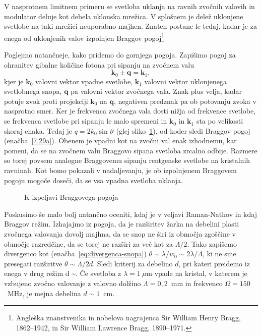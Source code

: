V nasprotnem limitnem primeru se svetloba uklanja na ravnih zvočnih valovih in modulator deluje 
kot debela uklonska mrežica. V splošnem je delež uklonjene svetlobe na taki mrežici neuporabno majhen. 
Znaten postane le tedaj, kadar je za enega od uklonjenih valov izpolnjen Braggov
pogoj\footnote{Angleška znanstvenika in nobelova nagrajenca Sir William Henry Bragg, 1862--1942,
in Sir William Lawrence Bragg, 1890--1971.}

Poglejmo natančneje, kako pridemo do gornjega pogoja. Zapišimo pogoj
za ohranitev gibalne količine fotona pri sipanju na zvočnem valu
\begin{equation}
\mathbf{k}_{0}\pm\mathbf{q}=\mathbf{k}_{1},
\label{7.30}
\end{equation}
kjer je $\mathbf{k}_{0}$ valovni vektor vpadne svetlobe, $\mathbf{k}_{1}$
valovni vektor uklonjenega svetlobnega snopa, $\mathbf{q}$ pa valovni
vektor zvočnega vala. Znak plus velja, kadar potuje zvok proti projekciji
$\mathbf{k}_{0}$ na $\mathbf{q}$, negativen predznak pa ob potovanju zvoka v nasprotno smer. 
Ker je frekvenca zvočnega vala dosti nižja od frekvence svetlobe, se frekvenca svetlobe 
pri sipanju le malo spremeni in $\mathbf{k}_{0}$ in $\mathbf{k}_{1}$ sta po velikosti skoraj enaka.
Tedaj je $q=2k_{0}\sin\vartheta$ (glej sliko~\ref{fig:ao_bragg3}), od koder sledi Braggov pogoj 
(enačba~\ref{7.29a}). Obenem je vpadni kot na zvočni val enak izhodnemu, kar pomeni, da se na
zvočnem valu Braggovo sipana svetloba zrcalno odbije. Razmere so torej
povsem analogne Braggovemu sipanju rentgenske svetlobe na kristalnih
ravninah. Kot bomo pokazali v nadaljevanju, je ob izpolnjenem Braggovem pogoju mogoče doseči, 
da se vsa vpadna svetloba uklanja.
\begin{figure}[h]
\centering
\def\svgwidth{40truemm} 

\caption{K izpeljavi Braggovega pogoja}
\label{fig:ao_bragg3}
\end{figure}
\begin{remark}
 Poskusimo še malo bolj natančno oceniti, kdaj je v veljavi Raman-Nathov in kdaj Braggov režim. 
Izhajajmo iz pogoja, da je razširitev žarka na debelini plasti zvočnega valovanja dovolj
 majhna, da se snop ne širi iz območja zgoščine v območje razredčine, da se torej ne razširi za 
 več kot za $\Lambda/2$. Tako zapišemo
 divergenco kot (enačba~\ref{eq:divergenca-snopa}) $\theta \sim \lambda/w_0 \sim 2\lambda/\Lambda$,
  ki ne sme presegati razširitve $\theta \sim \Lambda/2d$.
  Sledi kriterij za debelino $d$, pri kateri preidemo iz enega v drug režim
\beq
d \sim {}.
\eeq
Če svetloba z $\lambda = 1~\mu$m vpade na kristal, v katerem je vzbujeno zvočno
valovanje z valovno dolžino $\Lambda = 0,2$~mm in frekvenco $\Omega = 150$~MHz, je mejna 
debelina $d \sim 1$~cm.
\end{remark}

